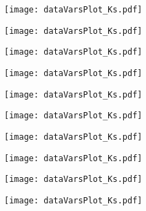 \begin{figure}[H]
\ContinuedFloat
\begin{subfigure}{0.5\linewidth}
	\texttt{[image: dataVarsPlot\_Ks.pdf]}
\end{subfigure}
\begin{subfigure}{0.5\linewidth}
	\texttt{[image: dataVarsPlot\_Ks.pdf]}
\end{subfigure}
\begin{subfigure}{0.5\linewidth}
	\texttt{[image: dataVarsPlot\_Ks.pdf]}
\end{subfigure}
\begin{subfigure}{0.5\linewidth}
	\texttt{[image: dataVarsPlot\_Ks.pdf]}
\end{subfigure}
\begin{subfigure}{0.5\linewidth}
	\texttt{[image: dataVarsPlot\_Ks.pdf]}
\end{subfigure}
\begin{subfigure}{0.5\linewidth}
	\texttt{[image: dataVarsPlot\_Ks.pdf]}
\end{subfigure}
\begin{subfigure}{0.5\linewidth}
	\texttt{[image: dataVarsPlot\_Ks.pdf]}
\end{subfigure}
\begin{subfigure}{0.5\linewidth}
	\texttt{[image: dataVarsPlot\_Ks.pdf]}
\end{subfigure}
\begin{subfigure}{0.5\linewidth}
	\texttt{[image: dataVarsPlot\_Ks.pdf]}
\end{subfigure}
\begin{subfigure}{0.5\linewidth}
	\texttt{[image: dataVarsPlot\_Ks.pdf]}
\end{subfigure}
\end{figure}

